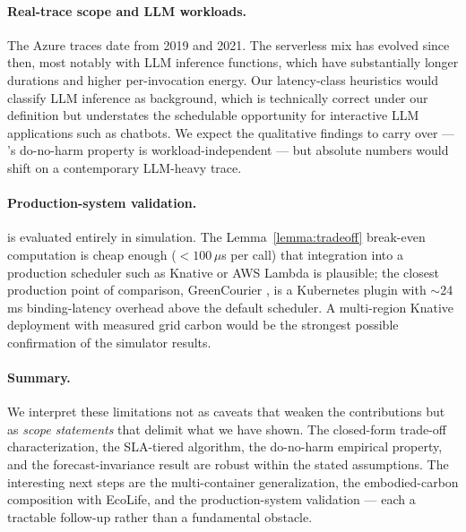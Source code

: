 \paragraph{Real-trace scope and LLM workloads.} The Azure traces date
from 2019 and 2021. The serverless mix has evolved since then, most
notably with LLM inference functions, which have substantially longer
durations and higher per-invocation energy. Our latency-class
heuristics would classify LLM inference as background, which is
technically correct under our definition but understates the
schedulable opportunity for interactive LLM applications such as
chatbots. We expect the qualitative findings to carry over ---
\GreenFaaS's do-no-harm property is workload-independent --- but
absolute numbers would shift on a contemporary LLM-heavy trace.

\paragraph{Production-system validation.} \GreenFaaS{} is evaluated
entirely in simulation. The Lemma~\ref{lemma:tradeoff} break-even
computation is cheap enough ($<100\,\mu$s per call) that integration
into a production scheduler such as Knative or AWS Lambda is
plausible; the closest production point of comparison, GreenCourier
\citep{chadha2023greencourier}, is a Kubernetes plugin with
$\sim$24\,ms binding-latency overhead above the default scheduler. A
multi-region Knative deployment with measured grid carbon would be
the strongest possible confirmation of the simulator results.

\paragraph{Summary.} We interpret these limitations not as caveats
that weaken the contributions but as \emph{scope statements} that
delimit what we have shown. The closed-form trade-off
characterization, the SLA-tiered algorithm, the do-no-harm empirical
property, and the forecast-invariance result are robust within the
stated assumptions. The interesting next steps are the
multi-container generalization, the embodied-carbon composition with
EcoLife, and the production-system validation --- each a tractable
follow-up rather than a fundamental obstacle.
